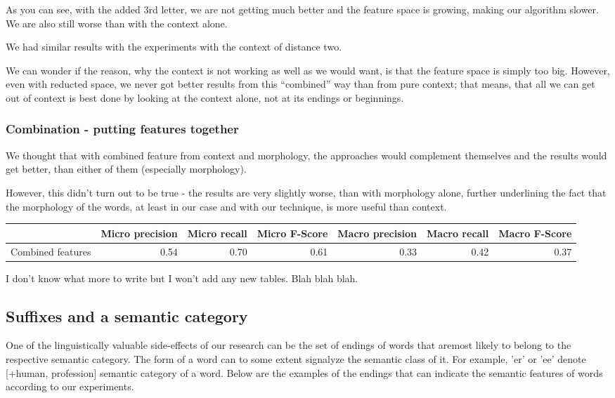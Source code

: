 \documentclass[letterpaper]{article}
\begin{document}
As you can see, with the added 3rd letter, we are not getting much better and the feature space is growing, making our algorithm slower. We are also still worse than with the context alone.

We had similar results with the experiments with the context of distance two.

We can wonder if the reason, why the context is not working as well as we would want, is that the feature space is simply too big. However, even with reducted space, we never got better results from this ``combined'' way than from pure context; that means, that all we can get out of context is best done by looking at the context alone, not at its endings or beginnings.

\subsubsection{Combination - putting features together}
We thought that with combined feature from context and morphology, the approaches would complement themselves and the results would get better, than either of them (especially morphology).

However, this didn't turn out to be true - the results are very slightly worse, than with morphology alone, further underlining the fact that the morphology of the words, at least in our case and with our technique, is more useful than context.

\begin{tabular}{|r|r|r|r|r|r|r|}
 \hline
 & \textbf{Micro precision} &  \textbf{Micro recall}  &  \textbf{Micro F-Score} & \textbf{Macro precision} &  \textbf{Macro recall}  &  \textbf{Macro F-Score} \\ \hline
Combined features & 0.54 & 0.70 & 0.61 & 0.33 & 0.42 & 0.37 \\ \hline
\end{tabular}

I don't know what more to write but I won't add any new tables. Blah blah blah.

\subsection{Suffixes and a semantic category}
One of the linguistically valuable side-effects of our research can be 
the set of endings of words that aremost likely to belong to the
respective semantic category.
The form of a word can to some extent signalyze the semantic class of it. 
For example, 'er' or 'ee' denote [+human, profession] semantic category of a word.
Below are the examples of the endings that
can indicate the semantic features of words according to our experiments.
\end{document}
